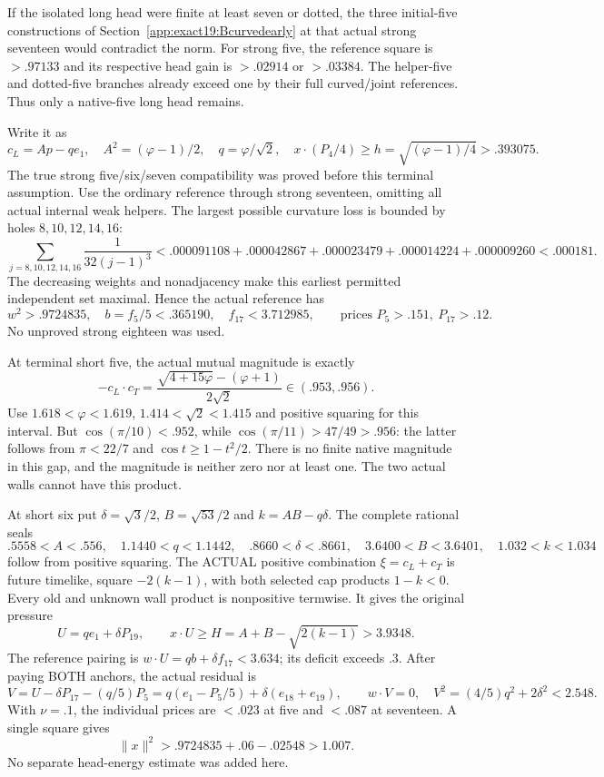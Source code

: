 If the isolated long head were
finite at least seven or dotted,
the three initial-five constructions
of Section~\ref{app:exact19:Bcurvedearly}
at that actual strong seventeen
would contradict the norm.
For strong five, the reference
square is \(>.97133\) and its
respective head gain is
\(>.02914\) or \(>.03384\).
The helper-five and dotted-five
branches already exceed one by
their full curved/joint references.
Thus only a native-five long
head remains.

Write it as
\[
 c_L=Ap-qe_1,\quad
 A^2=(\varphi-1)/2,\quad q=\varphi/\sqrt2,\quad
          x\cdot(P_4/4)\ge h=\sqrt{(\varphi-1)/4}>.393075 .
\]
The true strong five/six/seven
compatibility was proved before
this terminal assumption.
Use the ordinary reference through
strong seventeen, omitting all
actual internal weak helpers.
The largest possible curvature
loss is bounded by holes
\(8,10,12,14,16\):
\[
 \sum_{j=8,10,12,14,16}\frac1{32(j-1)^3}
 <.000091108+.000042867+.000023479+.000014224+.000009260
 <.000181 .
\]
The decreasing weights and
nonadjacency make this earliest
permitted independent set maximal.
Hence the actual reference has
\[
 w^2>.9724835,\quad b=f_5/5<.365190,\quad
 f_{17}<3.712985,\qquad
                  \text{prices }P_5>.151,\ P_{17}>.12 .
\tag{B19tightref}\label{app:exact19:eq:Btightref}
\]
No unproved strong eighteen
was used.

At terminal short five, the actual
mutual magnitude is exactly
\[
 -c_L\cdot c_T=
       \frac{\sqrt{4+15\varphi}-(\varphi+1)}{2\sqrt2}
                                 \in(.953,.956).
\]
Use \(1.618<\varphi<1.619\),
\(1.414<\sqrt2<1.415\) and positive
squaring for this interval.
But \(\cos(\pi/10)<.952\), while
\(\cos(\pi/11)>47/49>.956\):
the latter follows from
\(\pi<22/7\) and
\(\cos t\ge1-t^2/2\).
There is no finite native magnitude
in this gap, and the magnitude is
neither zero nor at least one.
The two actual walls cannot have
this product.

At short six put
\(\delta=\sqrt3/2\), \(B=\sqrt{53}/2\)
and \(k=AB-q\delta\).
The complete rational seals
\[
 .5558<A<.556,\quad1.1440<q<1.1442,\quad
 .8660<\delta<.8661,\quad3.6400<B<3.6401,\quad
                                      1.032<k<1.034
\]
follow from positive squaring.
The ACTUAL positive combination
\(\xi=c_L+c_T\) is future timelike,
square \(-2(k-1)\), with both
selected cap products \(1-k<0\).
Every old and unknown wall product
is nonpositive termwise.
It gives the original pressure
\[
 U=qe_1+\delta P_{19},\qquad
              x\cdot U\ge H=A+B-\sqrt{2(k-1)}>3.9348 .
\]
The reference pairing is
\(w\cdot U=qb+\delta f_{17}<3.634\);
its deficit exceeds \(.3\).
After paying BOTH anchors, the
actual residual is
\[
 V=U-\delta P_{17}-(q/5)P_5
          =q(e_1-P_5/5)+\delta(e_{18}+e_{19}),\qquad
       w\cdot V=0,\quad V^2=(4/5)q^2+2\delta^2<2.548 .
\]
With \(\nu=.1\), the individual
prices are \(<.023\) at five and
\(<.087\) at seventeen.
A single square gives
\[
                      \|x\|^2>.9724835+.06-.02548>1.007 .
\]
No separate head-energy estimate
was added here.


